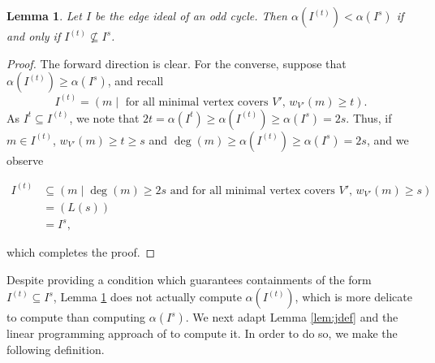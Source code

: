 \documentclass[12pt]{amsart}
\renewcommand{\geq}{\geqslant}
\renewcommand{\ge}{\geqslant}
\theoremstyle{plain}
\newtheorem{lem}[theorem]{Lemma}
\theoremstyle{definition}
\begin{document}
\begin{lem}\label{cor:mindegree}
Let $I$ be the edge ideal of an odd cycle. Then $\alpha(I^{(t)}) < \alpha(I^s)$ if and only if $I^{(t)} \not \subseteq I^s$.
\end{lem}
\begin{proof}
The forward direction is clear.
For the converse, suppose that $\alpha(I^{(t)}) \geq \alpha(I^s)$, and recall
\[
	I^{(t)} = (m \mid \text{ for all minimal vertex covers } V', \, w_{V'}(m) \geq t). 
\]
As $I^t \subseteq I^{(t)}$, we note that $2t = \alpha(I^t) \ge \alpha(I^{(t)}) \ge \alpha(I^s) = 2s$.
Thus, if $m\in I^{(t)}$, $w_{V'}(m) \ge t \ge s$ and $\deg(m) \ge \alpha(I^{(t)}) \ge \alpha(I^s) = 2s$, and we observe

\begin{align*}
	I^{(t)} &\subseteq (m \mid \deg(m) \ge 2s \text{ and for all minimal vertex covers } V', \, w_{V'}(m) \geq s)\\
	&= (L(s))\\
	&= I^s,
\end{align*}

which completes the proof.
\begin{comment}
For the converse, let $I^{(t)} \not \subseteq I^s$ and suppose that $\alpha(I^{(t)}) \geq \alpha(I^s)$. 
Note that $\alpha(I^s) = 2s$. From our definition of symbolic powers, we know 

As $\alpha(I^{(t)}) \geq 2s$, we will not eliminate any elements $m$ from $I^{(t)}$ by adding the condition that $\deg(m) \geq 2s$. Further, we know that $t \geq s$, because otherwise it would be easy to find a contradiction to the claim $\alpha(I^{(t)}) \geq \alpha(I^s)$ since we know that $I^t \subseteq I^{(t)}$. This means that if we replace the condition that $w_{V'}(m) \geq t$ with $w_{V'}(m) \geq s$, it will again be true that no elements from  $I^{(t)}$ will be lost.

Since no elements from $I^{(t)}$ are lost when we make those two changes, we know that $I^{(t)} \subseteq (\{m \mid \deg(m) \geq 2s \text{ and for all minimal vertex covers } V', \, w_{V'}(m) \geq s\})$. Notice that this new ideal is equal to $(L(s))$, which we have proven to be equal to $I^s$. Thus, we know $I^{(t)} \subseteq I^s$, which contradicts our original statement. Hence, if $I^{(t)} \not\subseteq I^s$, it must follow that $\alpha(I^{(t)}) < \alpha(I^s)$.
\end{comment}
\end{proof}

Despite providing a condition which guarantees containments of the form $I^{(t)}\subseteq I^s$, Lemma \ref{cor:mindegree} does not actually compute $\alpha(I^{(t)})$, which is more delicate to compute than computing $\alpha(I^s)$.
We next adapt Lemma \ref{lem:jdef} and the linear programming approach of \cite{2016:BocciMFO} to compute it.
In order to do so, we make the following definition.
\end{document}
